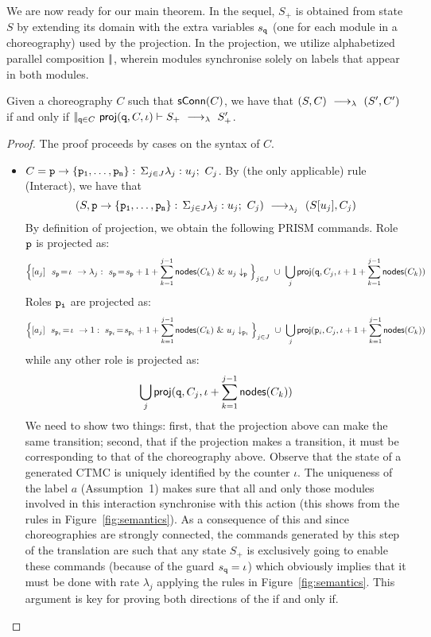 We are now ready for our main theorem. In the sequel, $S_+$ is
obtained from state $S$ by extending its domain with the extra
variables $s_{\mathtt{q}}$ (one for each module in a choreography) used
by the projection. 
In the projection, we utilize
alphabetized parallel composition $|\!|$, wherein modules synchronise
solely on labels that appear in both modules.
%
\begin{theorem}[Projection]\label{thm:epp}
  Given a choreography $C$ such that $\mathsf{sConn}(C)$, we have that
  $(S,C) \ \longrightarrow_{\lambda}\  (S', C')$ if and only if\quad
  $|\!|_{\mathtt{q}\in C}\ \mathsf{proj} (\mathtt{q}, C,\iota)\vdash S_{+}
  \ \longrightarrow_{\lambda}\  S_{+}'$.
\end{theorem}
\begin{proof}
  The proof proceeds by cases on the syntax of $C$.
  \begin{itemize}
  \item $C=\mathtt{p}\rightarrow \{\mathtt{\mathtt{p}_1,\ldots,\mathtt{p}_n}\}:\,\Sigma_{j\in J}\lambda_j: u_j;\ C_j$.  By (the only
    applicable) rule \textsf{(Interact)}, we have that
    \[
      (S, \mathtt{p}\rightarrow \{\mathtt{\mathtt{p}_1,\ldots,\mathtt{p}_n}\}:\,\Sigma_{j\in J}\lambda_j: u_j;\ C_j)
      \ \longrightarrow_{\lambda_j}\  (S[u_j], C_j) 
    \]
    By definition of projection, we obtain the following PRISM
    commands. Role $\mathtt{p}$ is projected as:
    \[
      \Big\{\commandBase {a_j} {\ s_{\role p}\!=\! \iota} {\lambda_j:\ s_{\role p}\!=\!
        s_{\role p} +1+\sum_{k=1}^{j-1}\mathsf{nodes}({C_k})}\ \&\ \projE
      {u_j}{\role p}\Big\}_{j\in J}
      \ \cup\ \bigcup_{j} \proj (\role q, C_j,
      \iota+1+\sum_{k=1}^{j-1}\mathsf{nodes}({C_k}))
    \]
    Roles $\mathtt{p_i}$ are projected as:
    \[
      \Big\{\commandBase {a_j} {\ s_{\role p_i}\!=\! \iota} {1:\ s_{\role p_i}\!=\!
        s_{\role p_i} +1+\sum_{k=1}^{j-1}\mathsf{nodes}({C_k})}\ \&\ 
       \projE{u_j}{\role p_i}\Big\}_{j\in J}
      \ \cup\ \bigcup_{j} \proj (\role p_i, C_j, \iota+1+\sum_{k=1}^{j-1}\mathsf{nodes}({C_k}))
    \]
    while any other role is projected as: 
    \[\bigcup_{j} \mathsf{proj} (\mathtt{q}, C_j, \iota+\sum_{k=1}^{j-1}\mathsf{nodes}({C_k}))
    \]
    We need to show two things: first, that the projection above can
    make the same transition; second, that if the projection makes a
    transition, it must be corresponding to that of the choreography
    above.
    Observe that the state of a generated CTMC is uniquely identified
    by the counter $\iota$.  The uniqueness of the label $a$
    (Assumption~1) makes sure that all and only those modules involved
    in this interaction synchronise with this action (this shows from
    the rules in Figure~\ref{fig:semantics}).  As a consequence of
    this and since choreographies are strongly connected, the commands
    generated by this step of the translation are such that any state
    $S_+$ is exclusively going to enable these commands (because of
    the guard $s_{\mathtt{q}}=\iota$) which obviously implies that it
    must be done with rate $\lambda_j$ applying the rules in
    Figure~\ref{fig:semantics}. This argument is key for proving both
    directions of the if and only if.


\end{itemize}
\end{proof}
